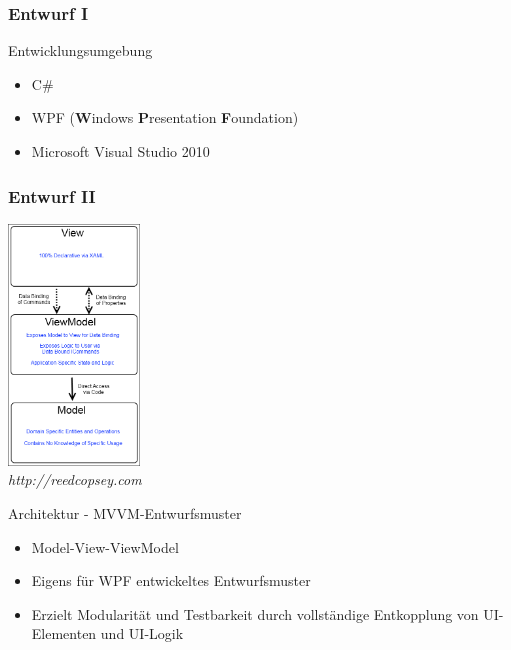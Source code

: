 \documentclass[t]{beamer}
\begin{document}
\begin{frame}
	\frametitle{Entwurf I}
	
	Entwicklungsumgebung ~\\
	\begin{itemize}
		\item<+-> C\#
		\item<+-> WPF (\textbf{W}indows \textbf{P}resentation \textbf{F}oundation)
		\item<+-> Microsoft Visual Studio 2010
	\end{itemize}
\end{frame}

\begin{frame}
	\frametitle{Entwurf II}
	\noindent
	\begin{minipage}{3.5cm}
	    \includegraphics[width=3.5cm]{MVVM_thumb.png} ~\\
	    \textit{http://reedcopsey.com}
	\end{minipage}
	\hfill
	\begin{minipage}{8cm}
		Architektur - MVVM-Entwurfsmuster ~\\
	    \begin{itemize}	    
	    	\item<+-> Model-View-ViewModel
	        \item<+-> Eigens für WPF entwickeltes Entwurfsmuster
	        \item<+-> Erzielt Modularität und Testbarkeit durch vollständige Entkopplung von UI-Elementen und UI-Logik
	    \end{itemize}
	\end{minipage}
\end{frame}
\end{document}
